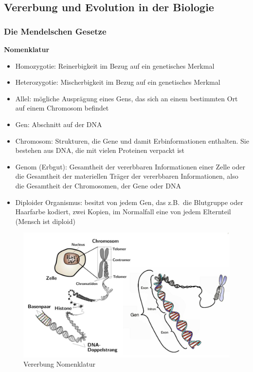 \subsection{Vererbung und Evolution in der Biologie}

\subsubsection{Die Mendelschen Gesetze}

\textbf{Nomenklatur}
\begin{itemize}
	\item Homozygotie: Reinerbigkeit im Bezug auf ein genetisches Merkmal
	\item Heterozygotie: Mischerbigkeit im Bezug auf ein genetisches Merkmal
	\item Allel: mögliche Ausprägung eines Gens, das sich an einem bestimmten Ort auf einem Chromosom befindet
	\item Gen: Abschnitt auf der DNA
	\item Chromosom: Strukturen, die Gene und damit Erbinformationen enthalten. Sie bestehen aus DNA, die mit vielen Proteinen verpackt ist
	\item Genom (Erbgut): Gesamtheit der vererbbaren Informationen einer Zelle oder die Gesamtheit der materiellen Träger der vererbbaren Informationen, also die Gesamtheit der Chromosomen, der Gene oder DNA
	\item Diploider Organismus: besitzt von jedem Gen, das z.B.\ die Blutgruppe oder Haarfarbe kodiert, zwei Kopien, im Normalfall eine von jedem Elternteil (Mensch ist diploid)
\end{itemize}

\begin{figure}
	\centering
	\includegraphics[width=.5\textwidth]{figures/nomenklatur.png}
	\caption{Vererbung Nomenklatur}
\end{figure}

